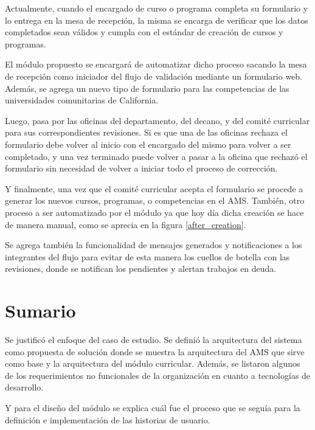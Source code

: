 Actualmente, cuando el encargado de curso o programa completa su formulario y lo entrega en la mesa de recepción, la misma se encarga de verificar que los datos completados sean válidos y cumpla con el estándar de creación de cursos y programas. 

El módulo propuesto se encargará de automatizar dicho proceso sacando la mesa de recepción como iniciador del flujo de validación mediante un formulario web. Además, se agrega un nuevo tipo de formulario para las competencias de las universidades comunitarias de California.

Luego, pasa por las oficinas del departamento, del decano, y del comité curricular para sus correspondientes revisiones. Si es que una de las oficinas rechaza el formulario debe volver al inicio con el encargado del mismo para volver a ser completado, y una vez terminado puede volver a pasar a la oficina que rechazó el formulario sin necesidad de volver a iniciar todo el proceso de corrección.

Y finalmente, una vez que el comité curricular acepta el formulario se procede a generar los nuevos cursos, programas, o competencias en el AMS. También, otro proceso a ser automatizado por el módulo ya que hoy día dicha creación se hace de manera manual, como se aprecia en la figura \ref{after_creation}.

Se agrega también la funcionalidad de mensajes generados y notificaciones a los integrantes del flujo para evitar de esta manera los cuellos de botella con las revisiones, donde se notifican los pendientes y alertan trabajos en deuda.





\section{Sumario}
Se justificó el enfoque del caso de estudio. Se definió la arquitectura del sistema como propuesta de solución donde se muestra la arquitectura del AMS que sirve como base y la arquitectura del módulo curricular. Además, se listaron algunos de los requerimientos no funcionales de la organización en cuanto a tecnologías de desarrollo.

Y para el diseño del módulo se explica cuál fue el proceso que se seguía para la definición e implementación de las historias de usuario.